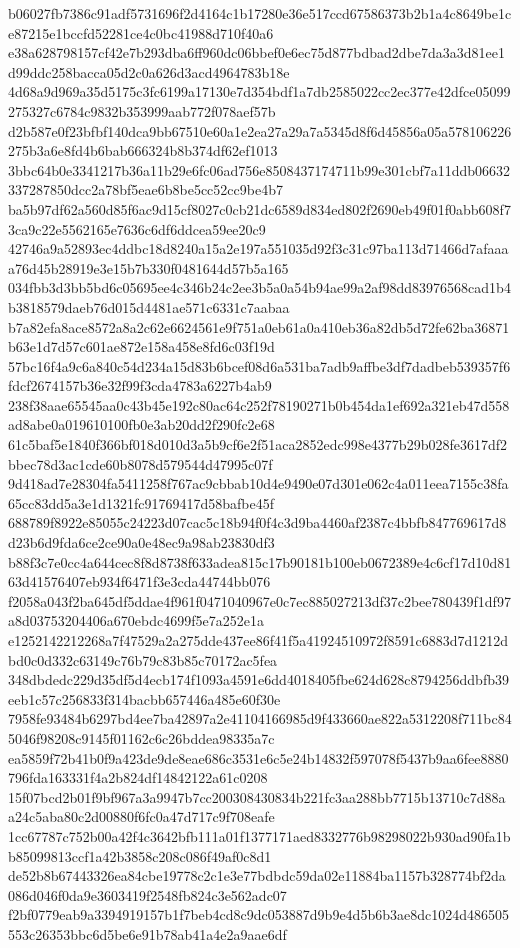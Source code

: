 \documentclass[11pt,a4paper]{article}
\begin{document}
{b06027fb7386c91adf5731696f2d4164c1b17280e36e517ccd67586373b2b1a4c8649be1ce87215e1bccfd52281ce4c0bc41988d710f40a6
e38a628798157cf42e7b293dba6ff960dc06bbef0e6ec75d877bdbad2dbe7da3a3d81ee1d99ddc258bacca05d2c0a626d3acd4964783b18e
4d68a9d969a35d5175c3fc6199a17130e7d354bdf1a7db2585022cc2ec377e42dfce05099275327c6784c9832b353999aab772f078aef57b
d2b587e0f23bfbf140dca9bb67510e60a1e2ea27a29a7a5345d8f6d45856a05a578106226275b3a6e8fd4b6bab666324b8b374df62ef1013
3bbc64b0e3341217b36a11b29e6fc06ad756e8508437174711b99e301cbf7a11ddb06632337287850dcc2a78bf5eae6b8be5cc52cc9be4b7
ba5b97df62a560d85f6ac9d15cf8027c0cb21dc6589d834ed802f2690eb49f01f0abb608f73ca9c22e5562165e7636c6df6ddcea59ee20c9
42746a9a52893ec4ddbc18d8240a15a2e197a551035d92f3c31c97ba113d71466d7afaaaa76d45b28919e3e15b7b330f0481644d57b5a165
034fbb3d3bb5bd6c05695ee4c346b24c2ee3b5a0a54b94ae99a2af98dd83976568cad1b4b3818579daeb76d015d4481ae571c6331c7aabaa
b7a82efa8ace8572a8a2c62e6624561e9f751a0eb61a0a410eb36a82db5d72fe62ba36871b63e1d7d57c601ae872e158a458e8fd6c03f19d
57bc16f4a9c6a840c54d234a15d83b6bcef08d6a531ba7adb9affbe3df7dadbeb539357f6fdcf2674157b36e32f99f3cda4783a6227b4ab9
238f38aae65545aa0c43b45e192c80ac64c252f78190271b0b454da1ef692a321eb47d558ad8abe0a019610100fb0e3ab20dd2f290fc2e68
61c5baf5e1840f366bf018d010d3a5b9cf6e2f51aca2852edc998e4377b29b028fe3617df2bbec78d3ac1cde60b8078d579544d47995c07f
9d418ad7e28304fa5411258f767ac9cbbab10d4e9490e07d301e062c4a011eea7155c38fa65cc83dd5a3e1d1321fc91769417d58bafbe45f
688789f8922e85055c24223d07cac5c18b94f0f4c3d9ba4460af2387c4bbfb847769617d8d23b6d9fda6ce2ce90a0e48ec9a98ab23830df3
b88f3c7e0cc4a644cec8f8d8738f633adea815c17b90181b100eb0672389e4c6cf17d10d8163d41576407eb934f6471f3e3cda44744bb076
f2058a043f2ba645df5ddae4f961f0471040967e0c7ec885027213df37c2bee780439f1df97a8d03753204406a670ebdc4699f5e7a252e1a
e1252142212268a7f47529a2a275dde437ee86f41f5a41924510972f8591c6883d7d1212dbd0c0d332c63149c76b79c83b85c70172ac5fea
348dbdedc229d35df5d4ecb174f1093a4591e6dd4018405fbe624d628c8794256ddbfb39eeb1c57c256833f314bacbb657446a485e60f30e
7958fe93484b6297bd4ee7ba42897a2e41104166985d9f433660ae822a5312208f711bc845046f98208c9145f01162c6c26bddea98335a7c
ea5859f72b41b0f9a423de9de8eae686c3531e6c5e24b14832f597078f5437b9aa6fee8880796fda163331f4a2b824df14842122a61c0208
15f07bcd2b01f9bf967a3a9947b7cc200308430834b221fc3aa288bb7715b13710c7d88aa24c5aba80c2d00880f6fc0a47d717c9f708eafe
1cc67787c752b00a42f4c3642bfb111a01f1377171aed8332776b98298022b930ad90fa1bb85099813ccf1a42b3858c208c086f49af0c8d1
de52b8b67443326ea84cbe19778c2c1e3e77bdbdc59da02e11884ba1157b328774bf2da086d046f0da9e3603419f2548fb824c3e562adc07
f2bf0779eab9a3394919157b1f7beb4cd8c9dc053887d9b9e4d5b6b3ae8dc1024d486505553c26353bbc6d5be6e91b78ab41a4e2a9aae6df
}
\end{document}
